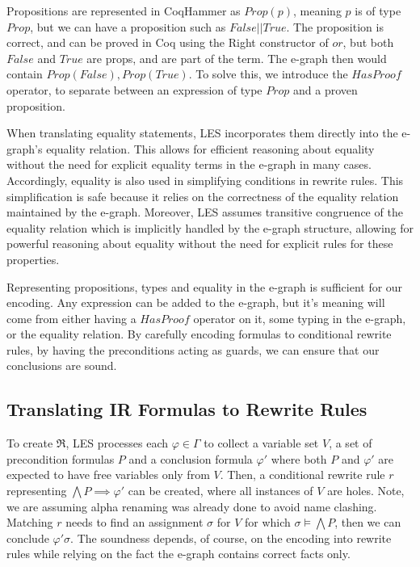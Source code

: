 Propositions are represented in CoqHammer as $Prop(p)$, meaning $p$ is of type $Prop$, but we can have a proposition such as $False || True$. 
The proposition is correct, and can be proved in Coq using the Right constructor of $or$, but both $False$ and $True$ are props, and are part of the term.
The e-graph then would contain $Prop(False),Prop(True)$.
To solve this, we introduce the $HasProof$ operator, to separate between an expression of type $Prop$ and a proven proposition.

When translating equality statements, LES incorporates them directly into the e-graph's equality relation.
This allows for efficient reasoning about equality without the need for explicit equality terms in the e-graph in many cases.
Accordingly, equality is also used in simplifying conditions in rewrite rules.
This simplification is safe because it relies on the correctness of the equality relation maintained by the e-graph.
Moreover, LES assumes transitive congruence of the equality relation which is implicitly handled by the e-graph structure, allowing for powerful reasoning about equality without the need for explicit rules for these properties. 

Representing propositions, types and equality in the e-graph is sufficient for our encoding.
Any expression can be added to the e-graph, but it's meaning will come from either having a $HasProof$ operator on it, some typing in the e-graph, or the equality relation.
By carefully encoding formulas to conditional rewrite rules, by having the preconditions acting as guards, we can ensure that our conclusions are sound.

\subsection{Translating IR Formulas to Rewrite Rules}
\label{translation:les:rwrules}

To create $\Re$, LES processes each $\varphi \in \Gamma$ to collect a variable set $V$, a set of precondition formulas $P$ and a conclusion formula $\varphi'$ where both $P$ and $\varphi'$ are expected to have free variables only from $V$.
Then, a conditional rewrite rule $r$ representing $\bigwedge P \implies \varphi'$ can be created, where all instances of $V$ are holes.
Note, we are assuming alpha renaming was already done to avoid name clashing.
Matching $r$ needs to find an assignment $\sigma$ for $V$ for which $\sigma \models \bigwedge P$, then we can conclude $\varphi'\sigma$.
The soundness depends, of course, on the encoding into rewrite rules while relying on the fact the e-graph contains correct facts only.

